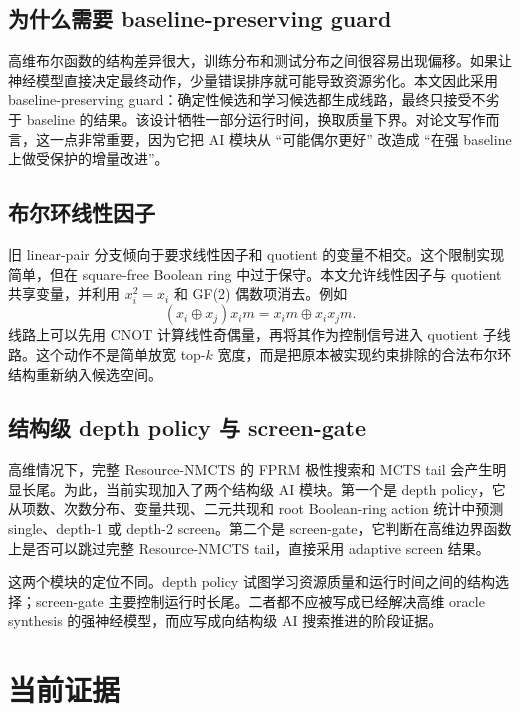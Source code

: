 \documentclass[UTF8,fontset=macnew,11pt]{ctexart}
\newcommand{\method}{Resource-NMCTS}
\newcommand{\cnot}{\ensuremath{\mathrm{CNOT}}}
\begin{document}
\subsection{为什么需要 baseline-preserving guard}

高维布尔函数的结构差异很大，训练分布和测试分布之间很容易出现偏移。如果让神经模型直接决定最终动作，少量错误排序就可能导致资源劣化。本文因此采用 baseline-preserving guard：确定性候选和学习候选都生成线路，最终只接受不劣于 baseline 的结果。该设计牺牲一部分运行时间，换取质量下界。对论文写作而言，这一点非常重要，因为它把 AI 模块从 ``可能偶尔更好'' 改造成 ``在强 baseline 上做受保护的增量改进''。

\subsection{布尔环线性因子}

旧 linear-pair 分支倾向于要求线性因子和 quotient 的变量不相交。这个限制实现简单，但在 square-free Boolean ring 中过于保守。本文允许线性因子与 quotient 共享变量，并利用 $x_i^2=x_i$ 和 GF(2) 偶数项消去。例如
\begin{equation}
  (x_i\oplus x_j)x_i m = x_i m\oplus x_i x_j m .
  \label{eq:boolean_ring}
\end{equation}
线路上可以先用 \cnot{} 计算线性奇偶量，再将其作为控制信号进入 quotient 子线路。这个动作不是简单放宽 top-$k$ 宽度，而是把原本被实现约束排除的合法布尔环结构重新纳入候选空间。

\subsection{结构级 depth policy 与 screen-gate}

高维情况下，完整 \method{} 的 FPRM 极性搜索和 MCTS tail 会产生明显长尾。为此，当前实现加入了两个结构级 AI 模块。第一个是 depth policy，它从项数、次数分布、变量共现、二元共现和 root Boolean-ring action 统计中预测 single、depth-1 或 depth-2 screen。第二个是 screen-gate，它判断在高维边界函数上是否可以跳过完整 \method{} tail，直接采用 adaptive screen 结果。

这两个模块的定位不同。depth policy 试图学习资源质量和运行时间之间的结构选择；screen-gate 主要控制运行时长尾。二者都不应被写成已经解决高维 oracle synthesis 的强神经模型，而应写成向结构级 AI 搜索推进的阶段证据。

\section{当前证据}
\end{document}
